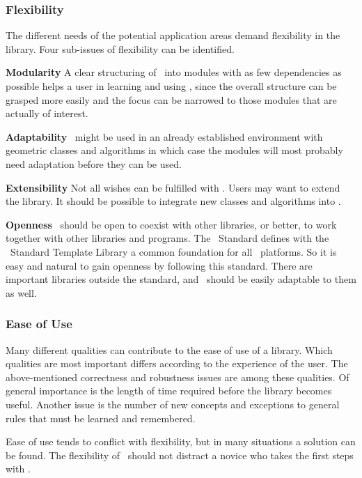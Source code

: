 \subsubsection*{Flexibility}
The different needs of the potential application areas demand 
flexibility in the library. Four sub-issues of flexibility can be identified.

{\bf Modularity}
A clear structuring of \cgal\ into modules with as few dependencies as
possible helps a user in learning and using \cgal, since the overall
structure can be grasped more easily and the focus can be narrowed to
those modules that are actually of interest. 

{\bf Adaptability}
\cgal\ might be used in an already established environment with
geometric classes and algorithms in which case the modules will 
most probably need adaptation before they can be used. 

{\bf Extensibility}
Not all wishes can be fulfilled with \cgal. Users may want to
extend the library. It should be possible to integrate new 
classes and algorithms into \cgal.

{\bf Openness}
\cgal\ should be open to coexist with other libraries, or better, to
work together with other libraries and programs. The \CC\ Standard
\ccIndexMainItem{\stl}
defines with the \CC\ Standard Template Library a common
foundation for all \CC\ platforms. 
So it is easy and natural to gain openness by following this standard.
There are important libraries outside the standard, and \cgal\
should be easily adaptable to them as well.

\subsubsection*{Ease of Use}
Many different qualities can contribute to the ease of use of a
library. Which qualities are most important differs according to 
the experience of the user.
The above-mentioned correctness and robustness issues are among
these qualities. Of general importance is the length of time required
before the library becomes useful. Another issue is the number of 
new concepts and
exceptions to general rules that must be learned and remembered.

Ease of use tends to conflict with flexibility, but in many
situations a solution can be found.
The flexibility of \cgal\ should not distract a novice who takes the 
first steps with \cgal.

